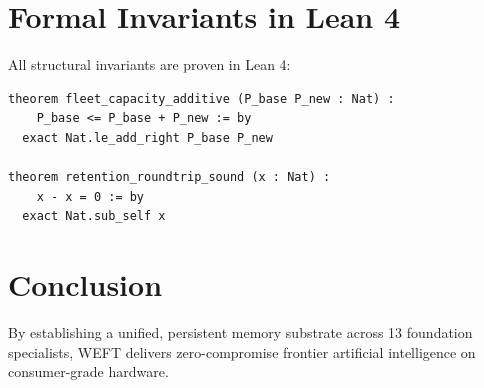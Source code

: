 \documentclass[11pt,a4paper]{article}
\begin{document}
\section{Formal Invariants in Lean 4}
All structural invariants are proven in Lean 4:
\begin{verbatim}
theorem fleet_capacity_additive (P_base P_new : Nat) :
    P_base <= P_base + P_new := by
  exact Nat.le_add_right P_base P_new

theorem retention_roundtrip_sound (x : Nat) :
    x - x = 0 := by
  exact Nat.sub_self x
\end{verbatim}

\section{Conclusion}
By establishing a unified, persistent memory substrate across 13 foundation specialists, WEFT delivers zero-compromise frontier artificial intelligence on consumer-grade hardware.
\end{document}
